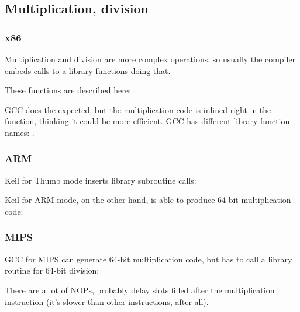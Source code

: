 ﻿\subsection{Multiplication, division}



\subsubsection{x86}



Multiplication and division are more complex operations, so usually the compiler embeds calls to
a library functions doing that.

These functions are described here: .



GCC does the expected, but the multiplication
code is inlined right in the function, thinking it could be more efficient.
GCC has different library function names: .

\subsubsection{ARM}

Keil for Thumb mode inserts library subroutine calls:



Keil for ARM mode, on the other hand, is able to produce 64-bit multiplication code:



\subsubsection{MIPS}

\Optimizing GCC for MIPS can generate 64-bit multiplication code, but has to call a library routine for 64-bit division:



There are a lot of \ac{NOP}s, probably delay slots filled after the multiplication instruction (it's slower
than other instructions, after all).


